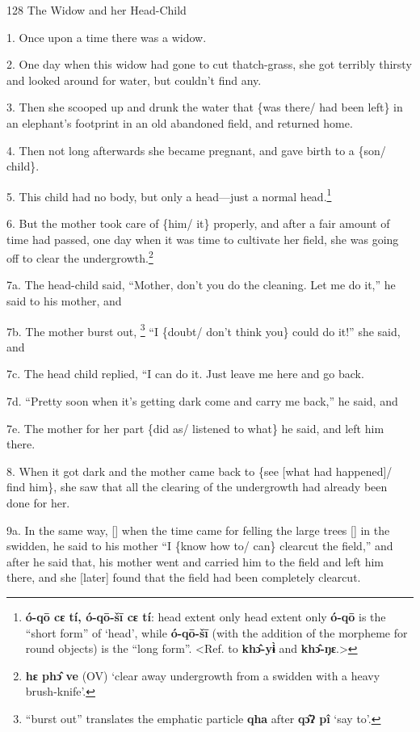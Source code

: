 
128 The Widow and her Head-Child

1. Once upon a time there was a widow.

2. One day when this widow had gone to cut thatch-grass, she got terribly thirsty
and looked around for water, but couldn't find any.

3. Then she scooped up and drunk the water that \{was there/ had been left\} in
an elephant's footprint in an old abandoned field, and returned home.

4. Then not long afterwards she became pregnant, and gave birth to a \{son/ child\}.

5. This child had no body, but only a head---just a normal head.\footnote{\textbf{ó-qō cɛ tí, ó-qō-šī cɛ tí}:  head extent only head extent only  \textbf{ó-qō} is the ``short form'' of `head', while \textbf{ó-qō-šī} (with the addition of the morpheme for round objects) is the ``long form''. <Ref. to \textbf{khɔ̂-yɨ̀ }and \textbf{khɔ̂-ŋɛ}.>}

6. But the mother took care of \{him/ it\} properly, and after a fair amount of
time had passed, one day when it was time to cultivate her field, she was going
off to clear the undergrowth.\footnote{\textbf{hɛ phɔ̂ ve }(OV) `clear away undergrowth from a swidden with a heavy brush-knife'.}

7a. The head-child said, ``Mother, don't you do the cleaning. Let me do it,'' he
said to his mother, and

7b. The mother burst out, \footnote{``burst out'' translates the emphatic particle \textbf{qha }after \textbf{qɔ̂ʔ pî} `say to'.} ``I \{doubt/ don't think you\} could do it!'' she
said, and

7c. The head child replied, ``I can do it. Just leave me here and go back.

7d. ``Pretty soon when it's getting dark come and carry me back,'' he said, and

7e. The mother for her part \{did as/ listened to what\} he said, and left him
there.

8. When it got dark and the mother came back to \{see [what had happened]/ find
him\}, she saw that all the clearing of the undergrowth had already been done for
her.

9a. In the same way, [] when the time came for felling the large trees [] in the
swidden, he said to his mother ``I \{know how to/ can\} clearcut the field,'' and
after he said that, his mother went and carried him to the field and left him there,
and she [later] found that the field had been completely clearcut.

